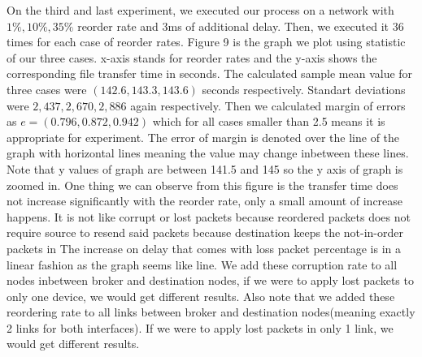 \documentclass[conference]{IEEEtran}
\begin{document}
On the third and last experiment, we executed our process on a network with $1\%,10\%,35\% $ reorder rate and 3ms of additional delay. Then, we executed it $36$ times for each case of reorder rates. Figure 9 is the graph we plot using statistic of our three cases. x-axis stands for reorder rates and the y-axis shows the corresponding file transfer time in seconds. The calculated sample mean value for three cases were $(142.6 , 143.3 , 143.6)$ seconds respectively. Standart deviations were $2,437, 2,670, 2,886$ again respectively. Then we calculated margin of errors as $e=(0.796 , 0.872 , 0.942)$ which for all cases smaller than 2.5 means it is appropriate for experiment. The error of margin is denoted over the line of the graph with horizontal lines meaning the value may change inbetween these lines. Note that y values of graph are between 141.5 and 145 so the y axis of graph is zoomed in. One thing we can observe from this figure is the transfer time does not increase significantly with the reorder rate, only a small amount of increase happens. It is not like corrupt or lost packets because reordered packets does not require source to resend said packets because destination keeps the not-in-order packets in The increase on delay that comes with loss packet percentage is in a linear fashion as the graph seems like line. We add these corruption rate to all nodes inbetween broker and destination nodes, if we were to apply lost packets to only one device, we would get different results. Also note that we added these reordering rate to all links between broker and destination nodes(meaning exactly 2 links for both interfaces). If we were to apply lost packets in only 1 link, we would get different results.  
\end{document}
